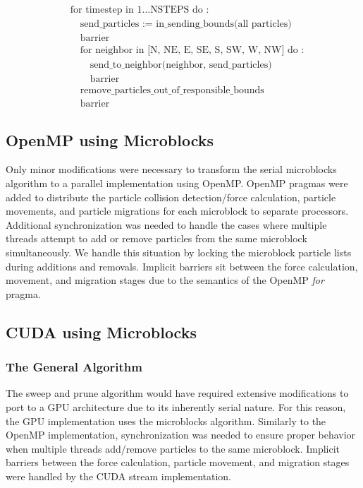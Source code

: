 \documentclass[11pt]{article} %
\begin{document}
\[
\begin{aligned} & \text{for timestep in }1\ldots\text{NSTEPS do :}\\
 & \quad\text{send\_particles := in\_sending\_bounds(all particles)}\\
 & \quad\text{barrier}\\
 & \quad\text{for neighbor in [N, NE, E, SE, S, SW, W, NW] do :}\\
 & \quad\quad\text{send\_to\_neighbor(neighbor, send\_particles)}\\
 & \quad\quad\text{barrier}\\
 & \quad\text{remove\_particles\_out\_of\_responsible\_bounds}\\
 & \quad\text{barrier}
\end{aligned}
\]

\subsection{OpenMP using Microblocks}

Only minor modifications were necessary to transform the serial microblocks algorithm to a parallel implementation using OpenMP. OpenMP pragmas were added to distribute the particle collision detection/force calculation, particle movements, and particle migrations for each microblock to separate processors. Additional synchronization was needed to handle the cases where multiple threads attempt to add or remove particles from the same microblock simultaneously. We handle this situation by locking the microblock particle lists during additions and removals. Implicit barriers sit between the force calculation, movement, and migration stages due to the semantics of the OpenMP {\em for} pragma.

\subsection{CUDA using Microblocks}

\subsubsection{The General Algorithm}

The sweep and prune algorithm would have required extensive modifications to port to a GPU architecture due to its inherently serial nature. For this reason, the GPU implementation uses the microblocks algorithm. Similarly to the OpenMP implementation, synchronization was needed to ensure proper behavior when multiple threads add/remove particles to the same microblock. Implicit barriers between the force calculation, particle movement, and migration stages were handled by the CUDA stream implementation.
\end{document}
